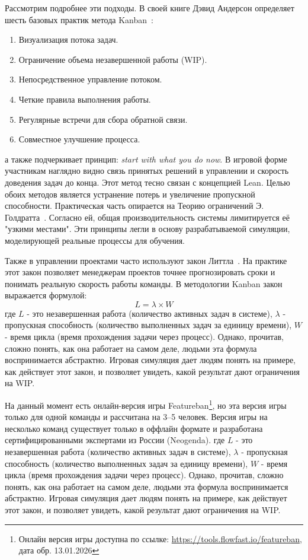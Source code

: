 Рассмотрим подробнее эти подходы. В своей книге Дэвид Андерсон определяет шесть базовых практик метода Kanban~\cite{kanban-book-and}:
\begin{enumerate}
    \item Визуализация потока задач.
    \item Ограничение объема незавершенной работы (WIP).
    \item Непосредственное управление потоком.
    \item Четкие правила выполнения работы.
    \item Регулярные встречи для сбора обратной связи.
    \item Совместное улучшение процесса.
\end{enumerate}
а также подчеркивает принцип: \textit{start with what you do now}. В игровой форме участникам наглядно видно связь принятых решений в управлении и скорость доведения задач до конца. Этот метод тесно связан с концепцией Lean. Целью обоих методов является устранение потерь и увеличение пропускной способности. Практическая часть опирается на Теорию ограничений Э. Голдратта~\cite{gold-goal-book}. Согласно ей, общая производительность системы лимитируется её "узкими местами". Эти принципы легли в основу разрабатываемой симуляции, моделирующей реальные процессы для обучения. 

Также в управлении проектами часто используют закон Литтла~\cite{little-law}. На практике этот закон позволяет менеджерам проектов точнее прогнозировать сроки и понимать реальную скорость работы команды. В методологии Kanban закон выражается формулой:
\begin{equation}
    \label{little-law-formula}
    L = \lambda\times W
\end{equation}
где $L$ - это незавершенная работа (количество активных задач в системе), $\lambda$ - пропускная способность (количество выполненных задач за единицу времени), $W$ - время цикла (время прохождения задачи через процесс). Однако, прочитав, сложно понять, как она работает на самом деле, людьми эта формула воспринимается абстрактно. Игровая симуляция дает людям понять на примере, как действует этот закон, и позволяет увидеть, какой результат дают ограничения на WIP. 

На данный момент есть онлайн-версия игры Featureban\footnote{Онлайн версия игры доступна по ссылке: \url{https://tools.flowfast.io/featureban}, дата обр. 13.01.2026}, но эта версия игры только для одной команды и рассчитана на 3–5 человек. Версия игры на несколько команд существует только в оффлайн формате и разработана сертифицированными экспертами из России (Neogenda)\cite{multi-featureban}. где $L$ - это незавершенная работа (количество активных задач в системе), $\lambda$ - пропускная способность (количество выполненных задач за единицу времени), $W$ - время цикла (время прохождения задачи через процесс). Однако, прочитав, сложно понять, как она работает на самом деле, людьми эта формула воспринимается абстрактно. Игровая симуляция дает людям понять на примере, как действует этот закон, и позволяет увидеть, какой результат дают ограничения на WIP. 

